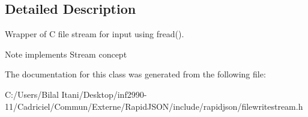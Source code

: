 \subsection{Detailed Description}
Wrapper of C file stream for input using fread(). 

\begin{DoxyNote}{Note}
implements Stream concept 
\end{DoxyNote}


The documentation for this class was generated from the following file\+:\begin{DoxyCompactItemize}
\item 
C\+:/\+Users/\+Bilal Itani/\+Desktop/inf2990-\/11/\+Cadriciel/\+Commun/\+Externe/\+Rapid\+J\+S\+O\+N/include/rapidjson/filewritestream.\+h\end{DoxyCompactItemize}
